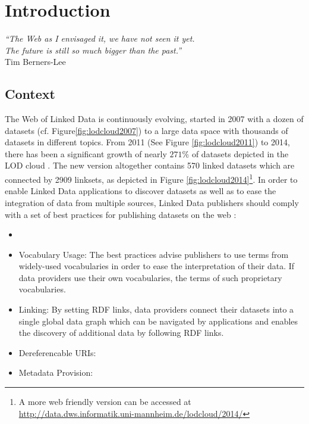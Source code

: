 \chapter{Introduction}
\label{intro}

\begin{flushright}
\textit{``The Web as I envisaged it, we have not seen it yet.\\ 
The future is still so much bigger than the past.''\\}
Tim Berners-Lee
\end{flushright}



\section{Context}
\label{sec:context}

The Web of Linked Data is continuously evolving, started in 2007 with a dozen of datasets (cf. Figure\ref{fig:lodcloud2007}) to a large data space with thousands of datasets in different topics. From 2011 (See Figure \ref{fig:lodcloud2011})\cite{jentzsch2011} to 2014, there has been a significant growth of nearly $271\%$ of datasets depicted in the LOD cloud \cite{max2014}. The new version altogether contains 570 linked datasets which are connected by 2909 linksets, as depicted in Figure \ref{fig:lodcloud2014}\footnote{A more web friendly version can be accessed at \url{http://data.dws.informatik.uni-mannheim.de/lodcloud/2014/}}. In order to enable
Linked Data applications to discover datasets as well as to ease the integration of data from multiple sources, Linked Data publishers should comply with a set of best practices for publishing datasets on the web \cite{Heath2011}:

\begin{itemize}
\item {}

\item Vocabulary Usage: The best practices advise publishers to use terms from
widely-used vocabularies in order to ease the interpretation of their data. If data providers use their own vocabularies, the terms of such proprietary vocabularies.

\item Linking: By setting RDF links, data providers connect their datasets into a single global data graph which can be navigated by applications and enables the discovery of additional data by following RDF links.

\item Dereferencable URIs:  

\item Metadata Provision: 
\end{itemize}

